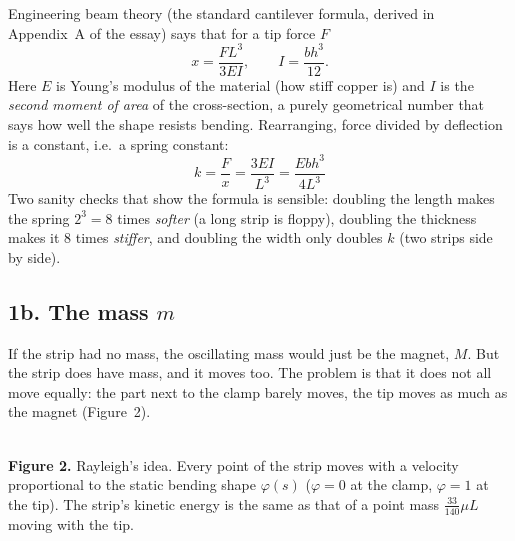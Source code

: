 \documentclass[11pt,a4paper]{article}
\begin{document}
Engineering beam theory (the standard cantilever formula, derived in Appendix~A of the essay) says that for a tip force $F$
\begin{equation}
x=\frac{FL^3}{3EI},\qquad I=\frac{bh^3}{12}.
\end{equation}
Here $E$ is Young's modulus of the material (how stiff copper is) and $I$ is the \emph{second moment of area} of the cross-section, a purely geometrical number that says how well the shape resists bending. Rearranging, force divided by deflection is a constant, i.e.\ a spring constant:
\begin{equation}
\boxed{k=\frac{F}{x}=\frac{3EI}{L^3}=\frac{Ebh^3}{4L^3}}
\end{equation}
Two sanity checks that show the formula is sensible: doubling the length makes the spring $2^3=8$ times \emph{softer} (a long strip is floppy), doubling the thickness makes it $8$ times \emph{stiffer}, and doubling the width only doubles $k$ (two strips side by side).

\subsection*{1b. The mass $m$}

If the strip had no mass, the oscillating mass would just be the magnet, $M$. But the strip does have mass, and it moves too. The problem is that it does not all move equally: the part next to the clamp barely moves, the tip moves as much as the magnet (Figure~2).

\begin{center}
\\[2pt]
{\small\textbf{Figure 2.} Rayleigh's idea. Every point of the strip moves with a velocity proportional to the static bending shape $\varphi(s)$ ($\varphi=0$ at the clamp, $\varphi=1$ at the tip). The strip's kinetic energy is the same as that of a point mass $\tfrac{33}{140}\mu L$ moving with the tip.}
\end{center}
\end{document}
